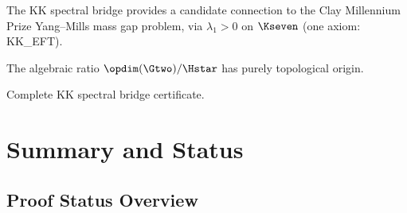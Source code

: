 \begin{theorem}\label{thm:clay}
    \leanok
    The KK spectral bridge provides a candidate connection to the Clay Millennium Prize
    Yang--Mills mass gap problem, via $\lambda_1 > 0$ on $\Kseven$ (one axiom: KK\_EFT).
\end{theorem}

\begin{theorem}\label{thm:topological_origin}
    \leanok
    The algebraic ratio $\opdim(\Gtwo) / \Hstar$ has purely topological origin.
\end{theorem}

\begin{theorem}\label{thm:ym_cert}
    \leanok
    Complete KK spectral bridge certificate.
\end{theorem}


\chapter{Summary and Status}\label{chap:summary}

\section{Proof Status Overview}

